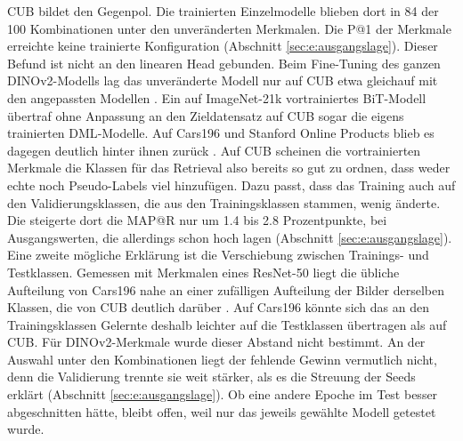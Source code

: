 \ac{CUB} bildet den Gegenpol. Die trainierten Einzelmodelle blieben dort in 84 der 100 Kombinationen unter den unveränderten Merkmalen. Die \ac{P@1} der Merkmale erreichte keine trainierte Konfiguration (Abschnitt \ref{sec:e:ausgangslage}). Dieser Befund ist nicht an den linearen Head gebunden. Beim Fine-Tuning des ganzen DINOv2-Modells lag das unveränderte Modell nur auf \ac{CUB} etwa gleichauf mit den angepassten Modellen \cite{berton_all_2025}. Ein auf ImageNet-21k vortrainiertes BiT-Modell übertraf ohne Anpassung an den Zieldatensatz auf \ac{CUB} sogar die eigens trainierten \ac{DML}-Modelle. Auf Cars196 und Stanford Online Products blieb es dagegen deutlich hinter ihnen zurück \cite{milbich_characterizing_2021}. Auf \ac{CUB} scheinen die vortrainierten Merkmale die Klassen für das Retrieval also bereits so gut zu ordnen, dass weder echte noch Pseudo-Labels viel hinzufügen. Dazu passt, dass das Training auch auf den Validierungsklassen, die aus den Trainingsklassen stammen, wenig änderte. Die \UEBL steigerte dort die \ac{MAP@R} nur um \num{1.4} bis \num{2.8} Prozentpunkte, bei Ausgangswerten, die allerdings schon hoch lagen (Abschnitt \ref{sec:e:ausgangslage}). Eine zweite mögliche Erklärung ist die Verschiebung zwischen Trainings- und Testklassen. Gemessen mit Merkmalen eines ResNet-50 liegt die übliche Aufteilung von Cars196 nahe an einer zufälligen Aufteilung der Bilder derselben Klassen, die von \ac{CUB} deutlich darüber \cite{milbich_characterizing_2021}. Auf Cars196 könnte sich das an den Trainingsklassen Gelernte deshalb leichter auf die Testklassen übertragen als auf \ac{CUB}. Für DINOv2-Merkmale wurde dieser Abstand nicht bestimmt. An der Auswahl unter den Kombinationen liegt der fehlende Gewinn vermutlich nicht, denn die Validierung trennte sie weit stärker, als es die Streuung der Seeds erklärt (Abschnitt \ref{sec:e:ausgangslage}). Ob eine andere Epoche im Test besser abgeschnitten hätte, bleibt offen, weil nur das jeweils gewählte Modell getestet wurde.

